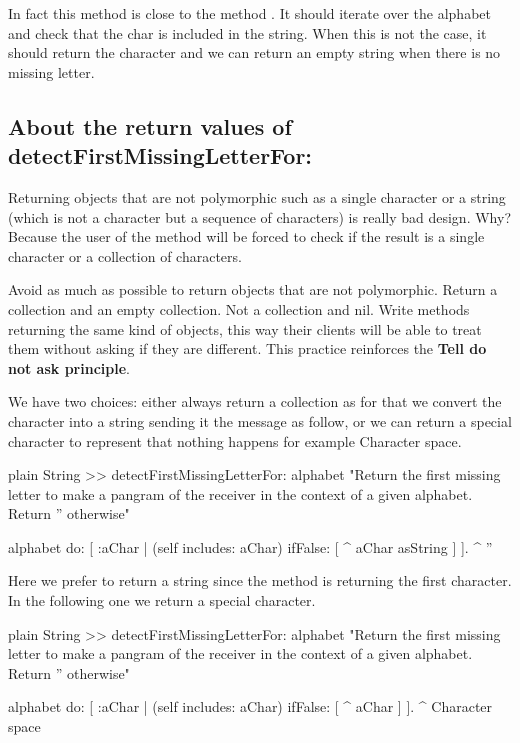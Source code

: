 \documentclass[10pt,twoside,english]{_support/latex/sbabook/sbabook}
\begin{document}
In fact this method is close to the method .  It should iterate over the alphabet and check that the char is included in the string. When this is not the case, it should return the character and we can return an empty string when there is no missing letter. 
\subsection{About the return values of detectFirstMissingLetterFor:}
Returning objects that are not polymorphic such as a single character or a string (which is not a character but a sequence of characters) is really bad design. 
Why? Because the user of the method will be forced to check if the result is a single character or a collection of characters.

\begin{coffee}
Avoid as much as possible to return objects that are not polymorphic. Return a collection and an empty collection. Not a collection and nil. Write methods returning the same kind of objects, this way their clients will be able to treat them without asking if they are different. This practice reinforces the \textbf{Tell do not ask principle}.
\end{coffee}

We have two choices: either always return  a collection as for that we convert the character into a string sending it the message  as follow, or we can return a special character to represent that nothing happens for example Character space. 

\begin{displaycode}{plain}
String >> detectFirstMissingLetterFor: alphabet
	"Return the first missing letter to make a pangram of the receiver in the context of a given alphabet. 
	Return '' otherwise"
	
	alphabet do: [ :aChar |
		(self includes: aChar)
			ifFalse: [ ^ aChar asString ]
		].
	^ ''
\end{displaycode}

Here we prefer to return a string since the method is returning the first character. 
In the following one we return a special character. 

\begin{displaycode}{plain}
String >> detectFirstMissingLetterFor: alphabet
	"Return the first missing letter to make a pangram of the receiver in the context of a given alphabet. 
	Return '' otherwise"
	
	alphabet do: [ :aChar |
		(self includes: aChar)
			ifFalse: [ ^ aChar ]
		].
	^ Character space
\end{displaycode}
\end{document}
